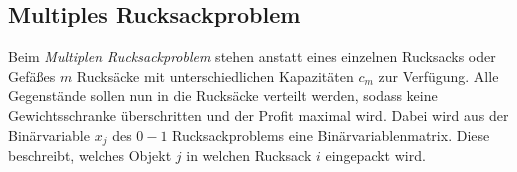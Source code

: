 \subsection{Multiples Rucksackproblem}
Beim \textit{Multiplen Rucksackproblem} stehen anstatt eines einzelnen Rucksacks oder Gefäßes $m$ Rucksäcke mit unterschiedlichen Kapazitäten $c_m$ zur Verfügung. Alle Gegenstände sollen nun in die Rucksäcke verteilt werden, sodass keine Gewichtsschranke überschritten und der Profit maximal wird. Dabei wird aus der Binärvariable $x_j$ des $0-1$ Rucksackproblems eine Binärvariablenmatrix. Diese beschreibt, welches Objekt $j$ in welchen Rucksack $i$ eingepackt wird. \cite[vgl.][]{Martello1990}
